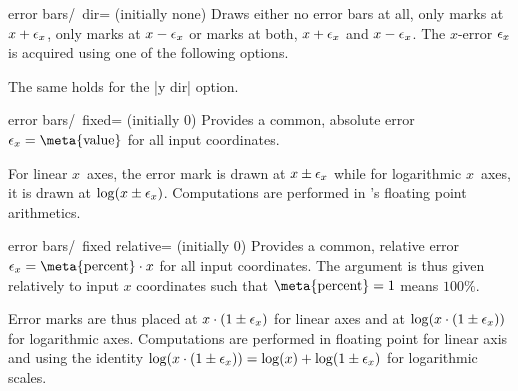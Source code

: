 {\begin{codeexample}[]
\end{codeexample}

\begin{pgfplotsxykey}{error bars/\x\ dir= (initially none)}
Draws either no error bars at all, only marks at $x+\epsilon_{x}$, only marks at $x-\epsilon_{x}$ or marks at both, $x+\epsilon_{x}$ and $x-\epsilon_{x}$. The $x$-error $\epsilon_{x}$ is acquired using one of the following options.

The same holds for the |y dir| option.
\end{pgfplotsxykey}

\begin{pgfplotsxykey}{error bars/\x\ fixed= (initially 0)}
Provides a common, absolute error $\pgfplotserror x=\text{\meta{value}}$ for all input coordinates.

For linear $x$~axes, the error mark is drawn at $x \pm \epsilon_{x}$ while for logarithmic $x$~axes, it is drawn at $\log( x \pm \epsilon_{x})$. Computations are performed in \PGF's floating point arithmetics.
\end{pgfplotsxykey}

\begin{pgfplotsxykey}{error bars/\x\ fixed relative= (initially 0)}
Provides a common, relative error $\pgfplotserror x = \text{\meta{percent}} \cdot x$ for all input coordinates. The argument  is thus given relatively to input $x$ coordinates such that $\text{\meta{percent}} = 1$ means $100\%$.

Error marks are thus placed at $x \cdot (1 \pm \epsilon_{x})$ for linear axes and at $\log(x \cdot (1 \pm \epsilon_{x}))$ for logarithmic axes. Computations are performed in floating point for linear axis and using the identity $\log(x \cdot (1 \pm \epsilon_{x})) = \log(x) + \log( 1 \pm \epsilon_{x})$ for logarithmic scales.
\end{pgfplotsxykey}

}
